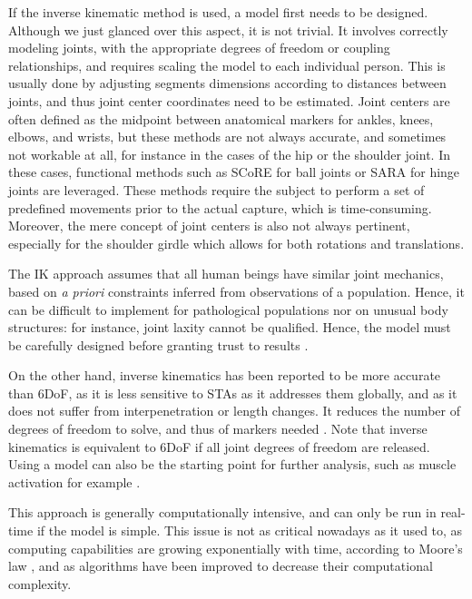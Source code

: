 If the inverse kinematic method is used, a model first needs to be designed. Although we just glanced over this aspect, it is not trivial. It involves correctly modeling joints, with the appropriate degrees of freedom or coupling relationships, and requires scaling the model to each individual person. This is usually done by adjusting segments dimensions according to distances between joints, and thus joint center coordinates need to be estimated. Joint centers are often defined as the midpoint between anatomical markers for ankles, knees, elbows, and wrists, but these methods are not always accurate, and sometimes not workable at all, for instance in the cases of the hip or the shoulder joint. In these cases, functional methods such as SCoRE for ball joints \cite{Ehrig2006} or SARA for hinge joints \cite{Ehrig2007} are leveraged. These methods require the subject to perform a set of predefined movements prior to the actual capture, which is time-consuming. Moreover, the mere concept of joint centers is also not always pertinent, especially for the shoulder girdle which allows for both rotations and translations. 

The IK approach assumes that all human beings have similar joint mechanics, based on \textit{a priori} constraints inferred from observations of a population. Hence, it can be difficult to implement for pathological populations nor on unusual body structures: for instance, joint laxity cannot be qualified. Hence, the model must be carefully designed before granting trust to results \cite{Hicks2015}. 

On the other hand, inverse kinematics has been reported to be more accurate than 6DoF, as it is less sensitive to STAs as it addresses them globally, and as it does not suffer from interpenetration or length changes. It reduces the number of degrees of freedom to solve, and thus of markers needed \cite{Slater2018}. Note that inverse kinematics is equivalent to 6DoF if all joint degrees of freedom are released. Using a model can also be the starting point for further analysis, such as muscle activation for example \cite{Robinson2013,Kain2016}.

This approach is generally computationally intensive, and can only be run in real-time if the model is simple. This issue is not as critical nowadays as it used to, as computing capabilities are growing exponentially with time, according to Moore's law \cite{Moore1965}, and as algorithms have been improved to decrease their computational complexity. 

